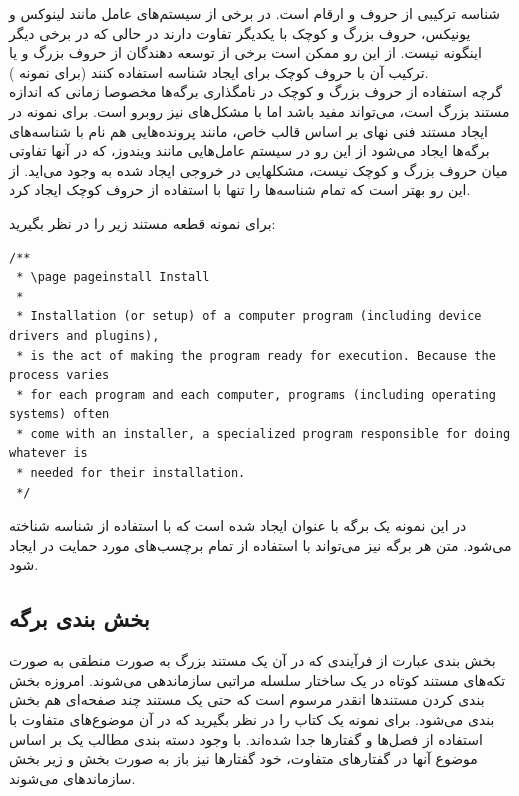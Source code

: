 \begin{note}
شناسه ترکیبی از حروف و ارقام است. در برخی از سیستم‌های عامل مانند لینوکس و
یونیکس، حروف بزرگ و کوچک با یکدیگر تفاوت دارند در حالی که در برخی دیگر اینگونه
نیست. از این رو ممکن است برخی از توسعه دهندگان از حروف بزرگ و یا ترکیب آن با
حروف کوچک برای ایجاد شناسه استفاده کنند (برای نمونه ). 
\\%
گرچه استفاده از حروف بزرگ و کوچک در نامگذاری برگه‌ها مخصوصا زمانی که اندازه
مستند بزرگ است، می‌تواند مفید باشد اما با مشکل‌های نیز روبرو است. برای نمونه در
ایجاد مستند فنی نهای بر اساس قالب خاص، مانند  پرونده‌هایی هم نام با
شناسه‌های برگه‌ها ایجاد می‌شود از این رو در سیستم عامل‌هایی مانند ویندوز، که در
آنها تفاوتی میان حروف بزرگ و کوچک نیست، مشکلهایی در خروجی ایجاد شده به وجود
می‌اید. از این رو بهتر است که تمام شناسه‌ها را تنها با استفاده از حروف کوچک
ایجاد کرد.
\end{note}

برای نمونه قطعه مستند زیر را در نظر بگیرید:
\begin{latin}
\lstset{language=C++}  
\begin{lstlisting}[frame=single] 
/**
 * \page pageinstall Install
 * 
 * Installation (or setup) of a computer program (including device drivers and plugins),
 * is the act of making the program ready for execution. Because the process varies
 * for each program and each computer, programs (including operating systems) often
 * come with an installer, a specialized program responsible for doing whatever is
 * needed for their installation.
 */
\end{lstlisting}
\end{latin}

در این نمونه یک برگه با عنوان  ایجاد شده است که با استفاده از شناسه
 شناخته می‌شود. متن هر برگه نیز می‌تواند با استفاده از تمام
برچسب‌های مورد حمایت در  ایجاد شود.


\subsection{بخش بندی برگه}

بخش بندی عبارت از فرآیندی که در آن یک مستند بزرگ به صورت منطقی به صورت تکه‌های
مستند کوتاه در یک ساختار سلسله مراتبی سازماندهی می‌شوند. امروزه بخش بندی کردن
مستندها انقدر مرسوم است که حتی یک مستند چند صفحه‌ای هم بخش بندی می‌شود. برای
نمونه یک کتاب را در نظر بگیرید که در آن موضوع‌های متفاوت با استفاده از فصل‌ها و
گفتارها جدا شده‌اند. با وجود دسته بندی مطالب یک بر اساس موضوع آنها در گفتارهای
متفاوت، خود گفتارها نیز باز به صورت بخش و زیر بخش سازماندهای می‌شوند.

